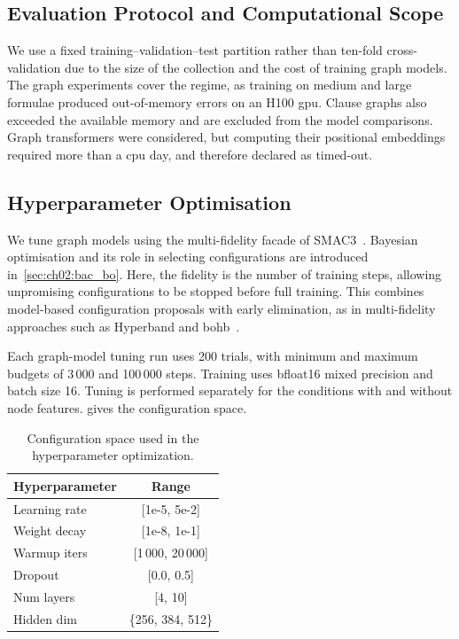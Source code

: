 \subsection{Evaluation Protocol and Computational Scope}
\label{sec:ch07:protocol}
We use a fixed training--validation--test partition rather than ten-fold cross-validation due to the size of the collection and the cost of training graph models. The graph experiments cover the  regime, as training on medium and large formulae produced out-of-memory errors on an H100 \gls{gpu}. Clause graphs also exceeded the available memory and are excluded from the model comparisons. Graph transformers were considered, but computing their positional embeddings required more than a \gls{cpu} day, and therefore declared as timed-out.

\subsection{Hyperparameter Optimisation}
\label{sec:ch07:hpo}
We tune graph models using the multi-fidelity facade of SMAC3~\citep{LinEtAl22b}. Bayesian optimisation and its role in selecting configurations are introduced in~\cref{sec:ch02:bac_bo}. Here, the fidelity is the number of training steps, allowing unpromising configurations to be stopped before full training. This combines model-based configuration proposals with early elimination, as in multi-fidelity approaches such as Hyperband and \gls{bohb}~\citep{LiEtAl17b,FalEtAl18}.

Each graph-model tuning run uses 200 trials, with minimum and maximum budgets of 3\,000 and 100\,000 steps. Training uses bfloat16 mixed precision and batch size 16. Tuning is performed separately for the conditions with and without node features.  gives the configuration space.

\begin{table}[htbp]
\caption[Graph model hyperparameter configuration space]{Configuration space used in the hyperparameter optimization.}
\label{tab:ch07:hpo_cs}

	\centering



	\begin{tabular}{lc}
		\toprule
		\textbf{Hyperparameter} & \textbf{Range}    \\

		\midrule
		Learning rate           & [1e-5, 5e-2]      \\
		Weight decay            & [1e-8, 1e-1]      \\
		Warmup iters            & [1\,000, 20\,000] \\
		Dropout                 & [0.0, 0.5]        \\
		Num layers              & [4, 10]           \\
		Hidden dim              & \{256, 384, 512\} \\

		\bottomrule
	\end{tabular}
\end{table}
\FloatBarrier

